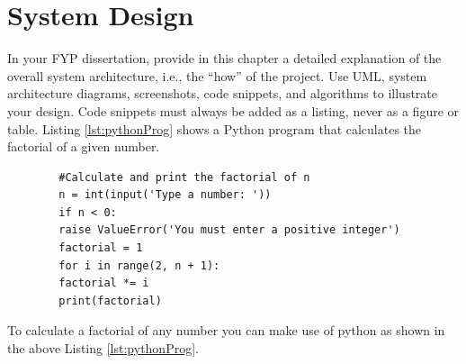 \chapter{System Design} \label{cha:systemdesign}
In your FYP dissertation, provide in this chapter a detailed explanation of the
overall system architecture, i.e., the “how” of the project. Use UML, system
architecture diagrams, screenshots, code snippets, and algorithms to illustrate
your design.
Code snippets must always be added as a listing, never as a figure or table.
Listing \ref{lst:pythonProg} shows a Python program that calculates the factorial of a given
number.
\begin{listing}[h]
    \begin{verbatim}
        #Calculate and print the factorial of n
        n = int(input('Type a number: '))
        if n < 0:
        raise ValueError('You must enter a positive integer')
        factorial = 1
        for i in range(2, n + 1):
        factorial *= i
        print(factorial)
    \end{verbatim}
    \caption{Example of a Python program that reads a typed number, then calculates and prints its factorial.}
    \label{lst:pythonProg}
\end{listing}

To calculate a factorial of any number you can make use of python as shown in the above Listing \ref{lst:pythonProg}.
